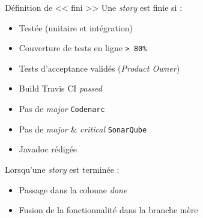 \begin{frame}{Définition de << fini >>}
	Une \textit{story} est finie si : 
	\vspace{-10px}
	\begin{itemize}
		\item Testée (unitaire et intégration)
		\item Couverture de tests en ligne \texttt{> 80\%}
		\item Tests d'acceptance validés (\textit{Product Owner})
		\item Build Travis CI \textit{passed}
		\item Pas de \textit{major} \texttt{Codenarc}
		\item Pas de \textit{major} \& \textit{critical} \texttt{SonarQube}
		\item Javadoc rédigée
	\end{itemize}
	\vfill
	\pause
	Lorsqu'une \textit{story} est terminée : 
	\vspace{-10px}
	\begin{itemize}
		\item Passage dans la colonne \textit{done}
		\item Fusion de la fonctionnalité dans la branche mère
	\end{itemize}





\end{frame}
